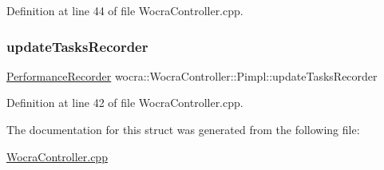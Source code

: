Definition at line 44 of file Wocra\+Controller.\+cpp.

\hypertarget{structwocra_1_1WocraController_1_1Pimpl_a91e262e3ecf52354aefa49e76b9e0eb9}{}\label{structwocra_1_1WocraController_1_1Pimpl_a91e262e3ecf52354aefa49e76b9e0eb9} 
\subsubsection{\texorpdfstring{update\+Tasks\+Recorder}{updateTasksRecorder}}
{\footnotesize\ttfamily \hyperlink{classwocra_1_1PerformanceRecorder}{Performance\+Recorder} wocra\+::\+Wocra\+Controller\+::\+Pimpl\+::update\+Tasks\+Recorder}



Definition at line 42 of file Wocra\+Controller.\+cpp.



The documentation for this struct was generated from the following file\+:\begin{DoxyCompactItemize}
\item 
\hyperlink{WocraController_8cpp}{Wocra\+Controller.\+cpp}\end{DoxyCompactItemize}
